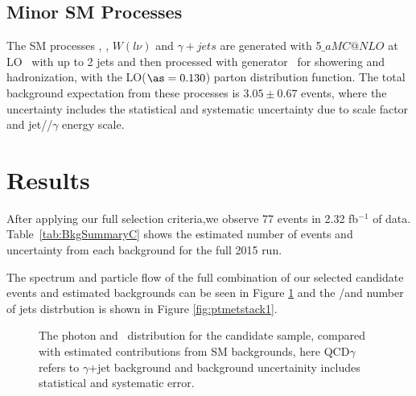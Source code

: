  \subsection{Minor SM Processes}
The SM processes \wlng, \zllg, $W(l\nu)$ and $\gamma+jets$
 are generated with \MADGRAPH{}5$\_aMC@NLO$ at LO~\cite{Madgraph_new}
 with up to 2 jets and then
 processed with  generator~\cite{Pythia6} for showering and hadronization,
 with the \NNPDFthree LO($\as = 0.130$) parton distribution function.
The total background expectation from these processes is $3.05\pm 0.67$ events,
 where the uncertainty includes the statistical and systematic uncertainty due
 to scale factor and jet/\met/$\gamma$ energy scale.


 
\section{Results}

After applying our full selection criteria,we observe 77 events in 2.32 fb$^{-1}$ of data.
Table~\ref{tab:BkgSummaryC}
shows the estimated number of events and uncertainty from each background for the full 2015 run.


The \pt spectrum and particle flow \met of the full combination of our selected candidate events and estimated backgrounds can be seen in Figure \ref{fig:ptmetstack}
and the \pt/\met and number of jets distrbution is shown in Figure \ref{fig:ptmetstack1}.

\begin{figure}[!h]
\centering
\caption{ The photon \pt and \met\ distribution for the candidate sample, compared with estimated contributions from SM backgrounds, here QCD$\gamma$ refers to $\gamma$+jet background and background uncertainity includes statistical and systematic error. }
\label{fig:ptmetstack}
\end{figure}


